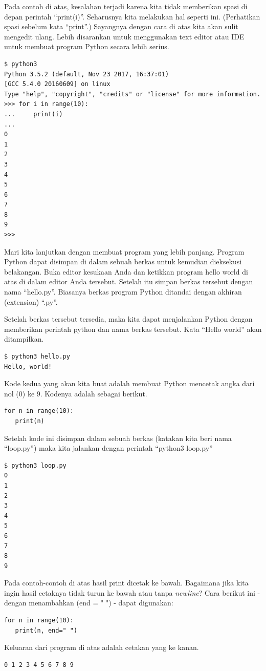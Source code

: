 Pada contoh di atas, kesalahan terjadi karena kita tidak memberikan spasi di
depan perintah ``print(i)''. Seharusnya kita melakukan hal seperti ini.
(Perhatikan spasi sebelum kata ``print''.)
Sayangnya dengan cara di atas kita akan sulit mengedit ulang.
Lebih disarankan untuk menggunakan text editor atau IDE untuk membuat
program Python secara lebih serius.

\begin{verbatim}
$ python3
Python 3.5.2 (default, Nov 23 2017, 16:37:01) 
[GCC 5.4.0 20160609] on linux
Type "help", "copyright", "credits" or "license" for more information.
>>> for i in range(10):
...     print(i)
... 
0
1
2
3
4
5
6
7
8
9
>>> 
\end{verbatim}


Mari kita lanjutkan dengan membuat program yang lebih panjang. Program Python
dapat disimpan di dalam sebuah berkas untuk kemudian dieksekusi belakangan.
Buka editor kesukaan Anda dan ketikkan program hello world di atas di dalam
editor Anda tersebut. Setelah itu simpan berkas tersebut dengan nama
``hello.py''. Biasanya berkas program Python ditandai dengan akhiran
(extension) ``.py''.

Setelah berkas tersebut tersedia, maka kita dapat menjalankan Python dengan
memberikan perintah python dan nama berkas tersebut. 
Kata ``Hello world'' akan ditampilkan.

\begin{verbatim}
$ python3 hello.py
Hello, world!
\end{verbatim}

Kode kedua yang akan kita buat adalah membuat Python mencetak angka dari 
nol (0) ke 9. Kodenya adalah sebagai berikut. 


\begin{verbatim}
for n in range(10):
   print(n)
\end{verbatim}

Setelah kode ini disimpan
dalam sebuah berkas (katakan kita beri nama ``loop.py'') maka kita jalankan
dengan perintah ``python3 loop.py''

\begin{verbatim}
$ python3 loop.py
0
1
2
3
4
5
6
7
8
9
\end{verbatim}

Pada contoh-contoh di atas hasil print dicetak ke bawah. Bagaimana jika kita
ingin hasil cetaknya tidak turun ke bawah atau tanpa {\em newline}?
Cara berikut ini - dengan menambahkan (end = " ") - dapat digunakan:

\begin{verbatim}
for n in range(10):
   print(n, end=" ")
\end{verbatim}
Keluaran dari program di atas adalah cetakan yang ke kanan.
\begin{verbatim}
0 1 2 3 4 5 6 7 8 9
\end{verbatim}


